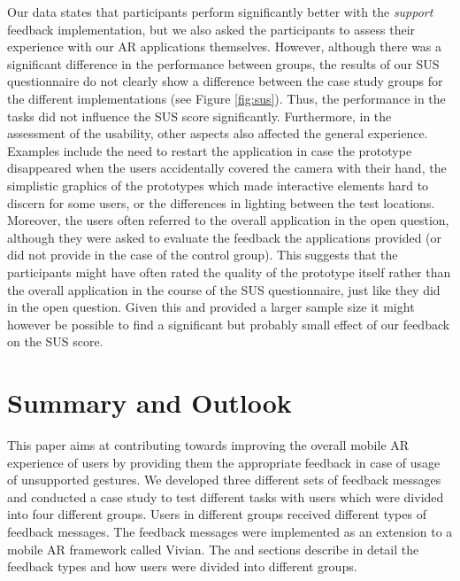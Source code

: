 \documentclass[11pt, a4paper]{article}
\begin{document}
			Our data states that participants perform significantly better with the \emph{support} feedback implementation, but we also asked the participants to assess their experience with our \ac{AR} applications themselves. However, although there was a significant difference in the performance between groups, the results of our \ac{SUS} questionnaire do not clearly show a difference between the case study groups for the different implementations (see Figure \ref{fig:sus}). Thus, the performance in the tasks did not influence the SUS score significantly. Furthermore, in the assessment of the usability, other aspects also affected the general experience. Examples include the need to restart the application in case the prototype disappeared when the users accidentally covered the camera with their hand, the simplistic graphics of the prototypes which made interactive elements hard to discern for some users, or the differences in lighting between the test locations. Moreover, the users often referred to the overall application in the open question, although they were asked to evaluate the feedback the applications provided (or did not provide in the case of the control group). This suggests that the participants might have often rated the quality of the prototype itself rather than the overall application in the course of the SUS questionnaire, just like they did in the open question. Given this and provided a larger sample size it might however be possible to find a significant but probably small effect of our feedback on the SUS score.


			


	\section*{Summary and Outlook}\label{sec:summary}
		This paper aims at contributing towards improving the overall mobile \ac{AR} experience of users by providing them the appropriate feedback in case of usage of unsupported gestures. We developed three different sets of feedback messages and conducted a case study to test different tasks with users which were divided into four different groups. Users in different groups received different types of feedback messages. The feedback messages were implemented as an extension to a mobile \ac{AR} framework called Vivian. The  and  sections describe in detail the feedback types and how users were divided into different groups.
		
\end{document}
